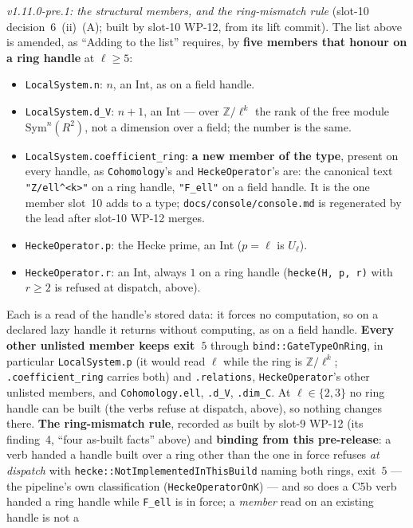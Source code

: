 \documentclass[11pt]{article}
\theoremstyle{remark}
\newcommand{\Z}{\mathbb{Z}}
\newcommand{\Sym}{\mathrm{Sym}}
\begin{document}
\emph{v1.11.0-pre.1: the structural members, and the ring-mismatch rule} (slot-10
decision~6~(ii)~(A); built by slot-10 WP-12, from its lift commit). The list above is amended, as
``Adding to the list'' requires, by \textbf{five members that honour on a ring handle} at
$\ell\ge5$:
\begin{itemize}
\item \texttt{LocalSystem.n}: $n$, an Int, as on a field handle.
\item \texttt{LocalSystem.d\_V}: $n+1$, an Int --- over $\Z/\ell^k$ the rank of the free module
  $\Sym^n(R^2)$, not a dimension over a field; the number is the same.
\item \texttt{LocalSystem.coefficient\_ring}: \textbf{a new member of the type}, present on every
  handle, as \texttt{Cohomology}'s and \texttt{HeckeOperator}'s are: the canonical text
  \texttt{"Z/ell\textasciicircum<k>"} on a ring handle, \texttt{"F\_ell"} on a field handle. It is
  the one member slot~10 adds to a type; \texttt{docs/console/console.md} is regenerated by the lead
  after slot-10 WP-12 merges.
\item \texttt{HeckeOperator.p}: the Hecke prime, an Int ($p=\ell$ is $U_\ell$).
\item \texttt{HeckeOperator.r}: an Int, always $1$ on a ring handle (\texttt{hecke(H, p, r)} with
  $r\ge2$ is refused at dispatch, above).
\end{itemize}
Each is a read of the handle's stored data: it forces no computation, so on a declared lazy handle
it returns without computing, as on a field handle. \textbf{Every other unlisted member keeps
exit~$5$} through \texttt{bind::GateTypeOnRing}, in particular \texttt{LocalSystem.p} (it would read
$\ell$ while the ring is $\Z/\ell^k$; \texttt{.coefficient\_ring} carries both) and
\texttt{.relations}, \texttt{HeckeOperator}'s other unlisted members, and \texttt{Cohomology.ell},
\texttt{.d\_V}, \texttt{.dim\_C}. At $\ell\in\{2,3\}$ no ring handle can be built (the verbs refuse
at dispatch, above), so nothing changes there. \textbf{The ring-mismatch rule}, recorded as built by
slot-9 WP-12 (its finding~4, ``four as-built facts'' above) and \textbf{binding from this
pre-release}: a verb handed a handle built over a ring other than the one in force refuses
\emph{at dispatch} with \texttt{hecke::NotImplementedInThisBuild} naming both rings, exit~$5$ --- the
pipeline's own classification (\texttt{HeckeOperatorOnK}) --- and so does a C5b verb handed a ring
handle while \texttt{F\_ell} is in force; a \emph{member} read on an existing handle is not a
\end{document}
